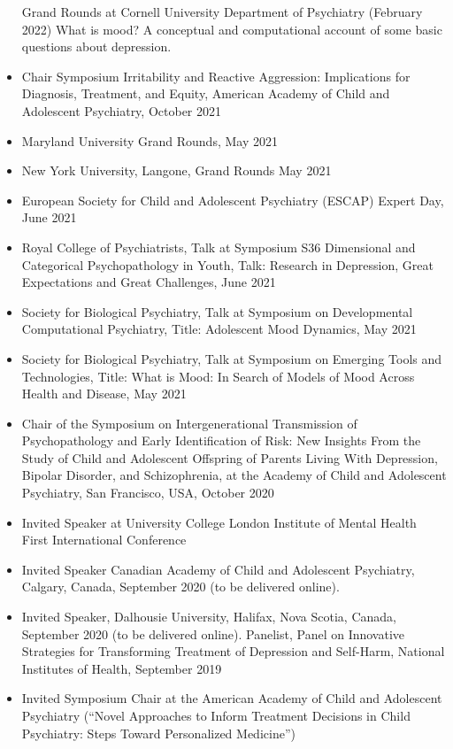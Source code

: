 \documentclass[
]{article}
\begin{document}
\begin{itemize}
  Grand Rounds at Cornell University Department of Psychiatry (February
  2022) What is mood? A conceptual and computational account of some
  basic questions about depression.
\item
  Chair Symposium Irritability and Reactive Aggression: Implications for
  Diagnosis, Treatment, and Equity, American Academy of Child and
  Adolescent Psychiatry, October 2021
\item
  Maryland University Grand Rounds, May 2021
\item
  New York University, Langone, Grand Rounds May 2021
\item
  European Society for Child and Adolescent Psychiatry (ESCAP) Expert
  Day, June 2021
\item
  Royal College of Psychiatrists, Talk at Symposium S36 Dimensional and
  Categorical Psychopathology in Youth, Talk: Research in Depression,
  Great Expectations and Great Challenges, June 2021
\item
  Society for Biological Psychiatry, Talk at Symposium on Developmental
  Computational Psychiatry, Title: Adolescent Mood Dynamics, May 2021
\item
  Society for Biological Psychiatry, Talk at Symposium on Emerging Tools
  and Technologies, Title: What is Mood: In Search of Models of Mood
  Across Health and Disease, May 2021
\item
  Chair of the Symposium on Intergenerational Transmission of
  Psychopathology and Early Identification of Risk: New Insights From
  the Study of Child and Adolescent Offspring of Parents Living With
  Depression, Bipolar Disorder, and Schizophrenia, at the Academy of
  Child and Adolescent Psychiatry, San Francisco, USA, October 2020
\item
  Invited Speaker at University College London Institute of Mental
  Health First International Conference
\item
  Invited Speaker Canadian Academy of Child and Adolescent Psychiatry,
  Calgary, Canada, September 2020 (to be delivered online).
\item
  Invited Speaker, Dalhousie University, Halifax, Nova Scotia, Canada,
  September 2020 (to be delivered online). Panelist, Panel on Innovative
  Strategies for Transforming Treatment of Depression and Self-Harm,
  National Institutes of Health, September 2019
\item
  Invited Symposium Chair at the American Academy of Child and
  Adolescent Psychiatry (``Novel Approaches to Inform Treatment
  Decisions in Child Psychiatry: Steps Toward Personalized Medicine'')

\end{itemize}
\end{document}

